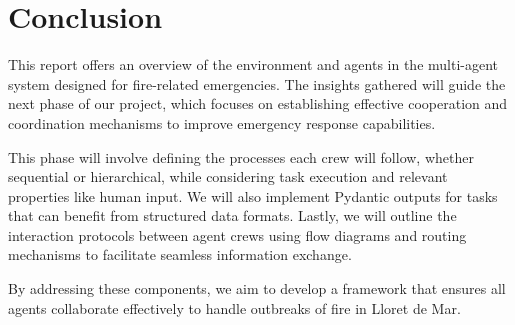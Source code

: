 \section{Conclusion}
This report offers an overview of the environment and agents in the multi-agent system designed for fire-related emergencies. The insights gathered will guide the next phase of our project, which focuses on establishing effective cooperation and coordination mechanisms to improve emergency response capabilities.

This phase will involve defining the processes each crew will follow, whether sequential or hierarchical, while considering task execution and relevant properties like human input. We will also implement Pydantic outputs for tasks that can benefit from structured data formats. Lastly, we will outline the interaction protocols between agent crews using flow diagrams and routing mechanisms to facilitate seamless information exchange.

By addressing these components, we aim to develop a framework that ensures all agents collaborate effectively to handle outbreaks of fire in Lloret de Mar.
